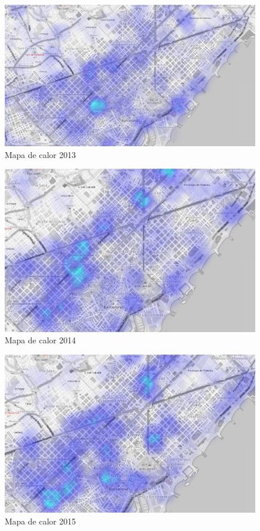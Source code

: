 \begin{figure}
    \includegraphics[width=\textwidth,height=\textheight,keepaspectratio]{mapesImg/heatmap2013.png}
    \caption{Mapa de calor 2013}
    \label{fig:heatmap3}
\end{figure}

\begin{figure}
    \includegraphics[width=\textwidth,height=\textheight,keepaspectratio]{mapesImg/heatmap2014.png}
    \caption{Mapa de calor 2014}
    \label{fig:heatmap4}
\end{figure}
\begin{figure}
    \includegraphics[width=\textwidth,height=\textheight,keepaspectratio]{mapesImg/heatmap2015.png}
    \caption{Mapa de calor 2015}
    \label{fig:heatmap5}
\end{figure}


